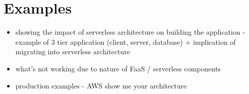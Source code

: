 

\section{Examples}

\begin{itemize}
    \item showing the impact of serverless architecture on building the application - example of 3 tier application (client, server, database) + implication of migrating into serverless architecture
    \item what's not working due to nature of FaaS / serverless components
    \item production examples - AWS show me your architecture
\end{itemize}




